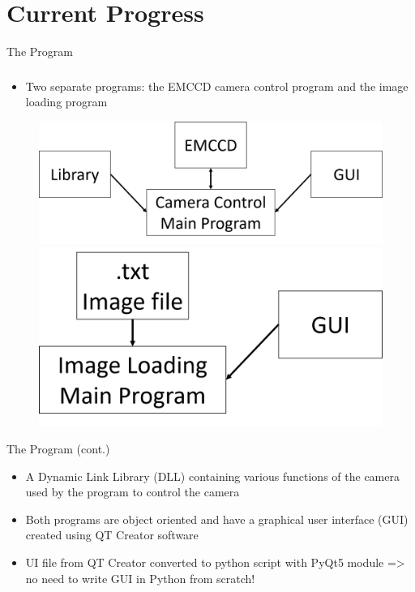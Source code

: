\documentclass{beamer}
\begin{document}
\section{Current Progress}
\begin{frame}{The Program}
\frametitle{}

\begin{itemize}
\item Two separate programs: the EMCCD camera control program and the image loading program
\end{itemize} 
\vspace{0.3cm}
\begin{figure}
\begin{center}
\includegraphics[scale=0.3]{Figures/cam_flow_chart.png}\\
\vspace{0.3cm}
\includegraphics[scale=0.3]{Figures/img_load_flow_chart.png}
\end{center}
\end{figure}


\end{frame}

\begin{frame}{The Program (cont.)}

\begin{itemize}
\item A Dynamic Link Library (DLL) containing various functions of the camera used by the program to control the camera
\bigskip
\item Both programs are object oriented and have a graphical user interface (GUI) created using QT Creator software
\bigskip
\item UI file from QT Creator converted to python script with PyQt5 module => no need to write GUI in Python from scratch!
\end{itemize}


\end{frame}
\end{document}

